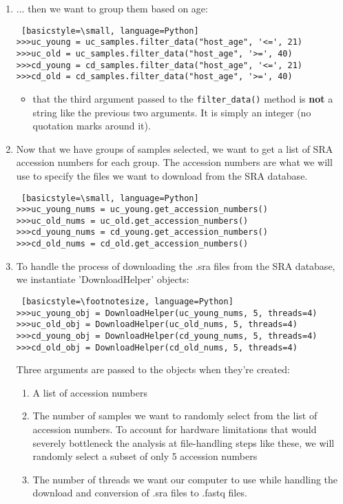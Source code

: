 \begin{enumerate}
                
            \item ... then we want to group them based on age:
            \begin{lstlisting} [basicstyle=\small, language=Python]
>>>uc_young = uc_samples.filter_data("host_age", '<=', 21)
>>>uc_old = uc_samples.filter_data("host_age", '>=', 40)
>>>cd_young = cd_samples.filter_data("host_age", '<=', 21)
>>>cd_old = cd_samples.filter_data("host_age", '>=', 40)
            \end{lstlisting}
                \begin{itemize}
                \item {} that the third argument passed to the \verb|filter_data()| method is \textbf{not} a string like the previous two arguments. It is simply an integer (no quotation marks around it).
                \end{itemize}
                
                
            \item Now that we have groups of samples selected, we want to get a list of SRA accession numbers for each group. The accession numbers are what we will use to specify the files we want to download from the SRA database. 
            \begin{lstlisting} [basicstyle=\small, language=Python]
>>>uc_young_nums = uc_young.get_accession_numbers()
>>>uc_old_nums = uc_old.get_accession_numbers()
>>>cd_young_nums = cd_young.get_accession_numbers()
>>>cd_old_nums = cd_old.get_accession_numbers()
            \end{lstlisting}
            
%             
            \item To handle the process of downloading the .sra files from the SRA database, we instantiate 'DownloadHelper' objects: 
            \begin{lstlisting} [basicstyle=\footnotesize, language=Python]
>>>uc_young_obj = DownloadHelper(uc_young_nums, 5, threads=4)
>>>uc_old_obj = DownloadHelper(uc_old_nums, 5, threads=4)
>>>cd_young_obj = DownloadHelper(cd_young_nums, 5, threads=4)
>>>cd_old_obj = DownloadHelper(cd_old_nums, 5, threads=4)
\end{lstlisting}

            Three arguments are passed to the objects when they're created:
            \begin{enumerate}
	       \item A list of accession numbers
	       \item The number of samples we want to randomly select from the list of accession numbers. To account for hardware limitations that would severely bottleneck the analysis at file-handling steps like these, we will randomly select a subset of only 5 accession numbers
	       \item {} The number of threads we want our computer to use while handling the download and conversion of .sra files to .fastq files.
            \end{enumerate}
            

\end{enumerate}
